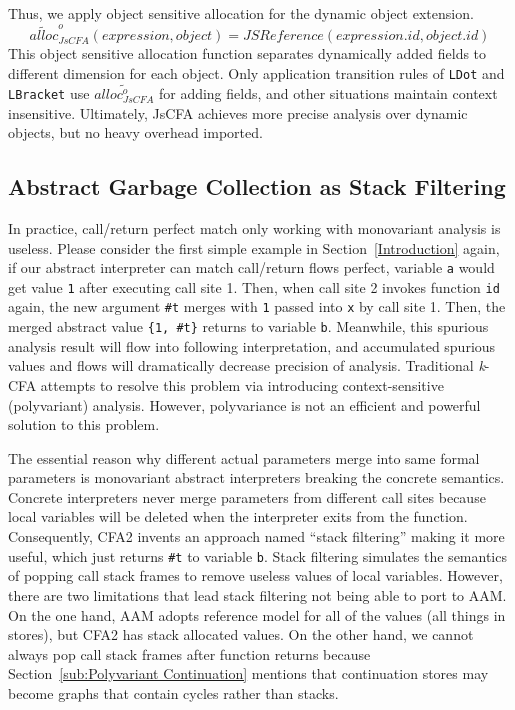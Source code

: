 \documentclass{article}
\begin{document}
Thus, we apply object sensitive allocation for the dynamic object extension.
\[
\widetilde{alloc}^{o}_{JsCFA}(expression, object) = JSReference(expression.id, object.id)
\]
This object sensitive allocation function separates dynamically added fields to different dimension for each object. Only application transition rules of \verb|LDot| and \verb|LBracket| use $\widetilde{alloc^{o}_{JsCFA}}$ for adding fields, and other situations maintain context insensitive.
Ultimately, JsCFA achieves more precise analysis over dynamic objects, but no heavy overhead imported.

\subsection{Abstract Garbage Collection as Stack Filtering}
\label{sub:filtering}
In practice, call/return perfect match only working with monovariant analysis is useless. Please consider the first simple example in Section~\ref{Introduction} again, if our abstract interpreter can match call/return flows perfect, variable \verb|a| would get value \verb|1| after executing call site 1. Then, when call site 2 invokes function \verb|id| again, the new argument \verb|#t| merges with \verb|1| passed into \verb|x| by call site 1. Then, the merged abstract value \verb|{1, #t}| returns to variable \verb|b|.
Meanwhile, this spurious analysis result will flow into following interpretation, and accumulated spurious values and flows will dramatically decrease precision of analysis.
Traditional \textit{k}-CFA attempts to resolve this problem via introducing context-sensitive (polyvariant) analysis. However, polyvariance is not an efficient and powerful solution to this problem.

The essential reason why different actual parameters merge into same formal parameters is monovariant abstract interpreters breaking the concrete semantics. Concrete interpreters never merge parameters from different call sites because local variables will be deleted when the interpreter exits from the function.
Consequently, CFA2 invents an approach named ``stack filtering'' making it more useful, which just returns \verb|#t| to variable \verb|b|. Stack filtering simulates the semantics of popping call stack frames to remove useless values of local variables. However, there are two limitations that lead stack filtering not being able to port to AAM\@. On the one hand, AAM adopts reference model for all of the values (all things in stores), but CFA2 has stack allocated values. On the other hand, we cannot always pop call stack frames after function returns because Section~\ref{sub:Polyvariant Continuation} mentions that continuation stores may become graphs that contain cycles rather than stacks.
\end{document}

